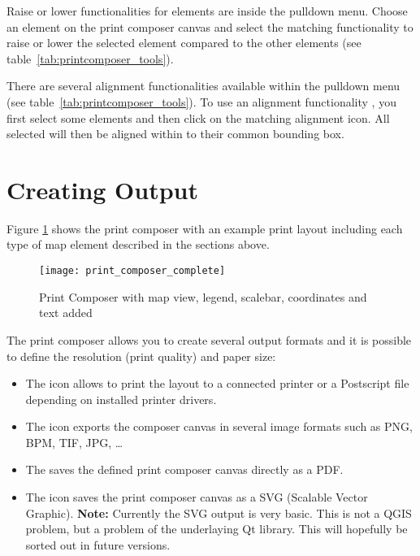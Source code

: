 Raise or lower functionalities for elements are inside the
 pulldown menu. Choose an
element on the print composer canvas and select the matching functionality to
raise or lower the selected element compared to the other elements (see
table~\ref{tab:printcomposer_tools}). 

There are several alignment functionalities available within the
 pulldown menu (see
table~\ref{tab:printcomposer_tools}). To use an alignment functionality , you
first select some elements and then click on the matching alignment icon. All
selected will then be aligned within to their common bounding box.       

\section{Creating Output}

Figure \ref{fig:print_composer_complete} shows the print composer with an example 
print layout including each type of map element described in the sections above.

\begin{figure}[h]
   \centering
   \texttt{[image: print\_composer\_complete]}
   \caption{Print Composer with map view, legend, scalebar, coordinates and text added \nixcaption} \label{fig:print_composer_complete}
\end{figure}

The print composer allows you to create several output formats and it is possible to 
define the resolution (print quality) and paper size:

\begin{itemize}[label=--]
\item The  icon allows to print the layout 
to a connected printer or a Postscript file depending on installed printer 
drivers.
\item The  icon exports the 
composer canvas in several image formats such as PNG, BPM, TIF, JPG, \dots
\item The  saves the defined
print composer canvas directly as a PDF.
\item The  icon saves the print 
composer canvas as a SVG (Scalable Vector Graphic). \textbf{Note:} Currently the 
SVG output is very basic. This is not a QGIS problem, but a problem of the underlaying 
Qt library. This will hopefully be sorted out in future versions.
\end{itemize}

